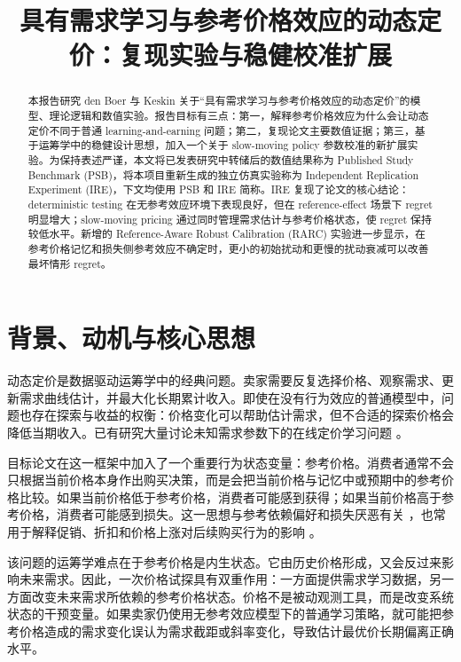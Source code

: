 \documentclass[conference]{../../LaTex_Template/IEEEtran}
\begin{document}
\title{具有需求学习与参考价格效应的动态定价：复现实验与稳健校准扩展}

\author{
}

\maketitle

\begin{abstract}
本报告研究 den Boer 与 Keskin 关于“具有需求学习与参考价格效应的动态定价”的模型、理论逻辑和数值实验。报告目标有三点：第一，解释参考价格效应为什么会让动态定价不同于普通 learning-and-earning 问题；第二，复现论文主要数值证据；第三，基于运筹学中的稳健设计思想，加入一个关于 slow-moving policy 参数校准的新扩展实验。为保持表述严谨，本文将已发表研究中转储后的数值结果称为 Published Study Benchmark (PSB)，将本项目重新生成的独立仿真实验称为 Independent Replication Experiment (IRE)，下文均使用 PSB 和 IRE 简称。IRE 复现了论文的核心结论：deterministic testing 在无参考效应环境下表现良好，但在 reference-effect 场景下 regret 明显增大；slow-moving pricing 通过同时管理需求估计与参考价格状态，使 regret 保持较低水平。新增的 Reference-Aware Robust Calibration (RARC) 实验进一步显示，在参考价格记忆和损失侧参考效应不确定时，更小的初始扰动和更慢的扰动衰减可以改善最坏情形 regret。
\end{abstract}

\section{背景、动机与核心思想}
动态定价是数据驱动运筹学中的经典问题。卖家需要反复选择价格、观察需求、更新需求曲线估计，并最大化长期累计收入。即使在没有行为效应的普通模型中，问题也存在探索与收益的权衡：价格变化可以帮助估计需求，但不合适的探索价格会降低当期收入。已有研究大量讨论未知需求参数下的在线定价学习问题 \cite{broderRusmevichientong2012,keskinZeevi2014}。

目标论文在这一框架中加入了一个重要行为状态变量：参考价格。消费者通常不会只根据当前价格本身作出购买决策，而是会把当前价格与记忆中或预期中的参考价格比较。如果当前价格低于参考价格，消费者可能感到获得；如果当前价格高于参考价格，消费者可能感到损失。这一思想与参考依赖偏好和损失厌恶有关 \cite{tverskyKahneman1991}，也常用于解释促销、折扣和价格上涨对后续购买行为的影响 \cite{popescuWu2007}。

该问题的运筹学难点在于参考价格是内生状态。它由历史价格形成，又会反过来影响未来需求。因此，一次价格试探具有双重作用：一方面提供需求学习数据，另一方面改变未来需求所依赖的参考价格状态。价格不是被动观测工具，而是改变系统状态的干预变量。如果卖家仍使用无参考效应模型下的普通学习策略，就可能把参考价格造成的需求变化误认为需求截距或斜率变化，导致估计最优价长期偏离正确水平。
\end{document}
